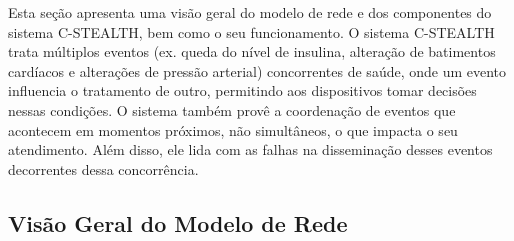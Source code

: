 \documentclass[12pt]{article}
\begin{document}
Esta seção apresenta uma visão geral do modelo de rede e dos componentes do sistema \mbox{C-STEALTH}, bem como o seu funcionamento. O sistema \mbox{C-STEALTH} trata múltiplos eventos (ex. queda do nível de insulina, alteração de batimentos cardíacos e alterações de pressão arterial) concorrentes de saúde, onde um evento influencia o tratamento de outro, permitindo aos %
dispositivos tomar decisões
nessas condições.
O sistema também provê a coordenação de eventos que acontecem em momentos próximos, não simultâneos, o que impacta o seu atendimento.
Além disso, ele 
lida com
as falhas na disseminação desses eventos decorrentes dessa concorrência. 

\subsection{Visão Geral do Modelo de Rede} 
\label{sec:models}
\end{document}
